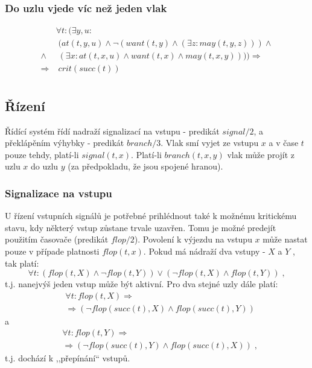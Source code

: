 \documentclass[a4paper,journal]{IEEEtran}
\begin{document}
\subsubsection{Do uzlu vjede víc než jeden vlak}
\begin{equation}
\begin{split}
&\forall t: (\exists y,u: \\
&\;(at(t,y,u) \wedge \neg (want(t,y) \wedge (\exists z: may(t,y,z)))\wedge \\
\wedge&\;(\exists x:  at(t,x,u) \wedge want(t,x) \wedge may(t,x,y)))) \Rightarrow\\
 \Rightarrow &\;crit(succ(t))\\
\end{split}
\end{equation}

\subsection{Řízení}
Řídící systém řídí nadraží signalizací na vstupu - predikát $signal/2$, 
a překlápěním výhybky - predikát $branch/3$. Vlak smí vyjet ze vstupu $x$ a v čase $t$ 
pouze tehdy, platí-li $signal(t,x)$.
Platí-li $branch(t,x,y)$ vlak může projít z uzlu $x$ do uzlu $y$ (za předpokladu, že jsou spojené hranou).

\subsubsection{Signalizace na vstupu}
U řízení vstupních signálů je potřebné prihlédnout také k možnému kritickému stavu, kdy některý vstup
zůstane trvale uzavřen. Tomu je možné predejít použitím časovače (predikát $flop/2$). 
Povolení k výjezdu na vstupu $x$ může nastat pouze v případe platnosti $flop(t,x)$.
Pokud má nádraží dva vstupy - $X$ a $Y$ , tak platí:
\begin{equation}\label{eq:flop}
\forall t: (flop(t,X)\wedge\neg flop(t,Y))\vee (\neg flop(t,X)\wedge flop(t,Y))\;,
\end{equation}
t.j. nanejvýš jeden vstup může být aktivní.
Pro dva stejné uzly dále platí:
\begin{equation}\label{eq:flop1}
\begin{split}
&\forall t: flop(t,X) \Rightarrow \\
&\Rightarrow(\neg flop(succ(t),X) \wedge flop(succ(t),Y))
\end{split}
\end{equation}
a
\begin{equation}\label{eq:flop2}
\begin{split}
&\forall t: flop(t,Y) \Rightarrow \\
&\Rightarrow(\neg flop(succ(t),Y) \wedge flop(succ(t),X))\;,
\end{split}
\end{equation}
t.j. dochází k ,,přepínání`` vstupů.
\end{document}
